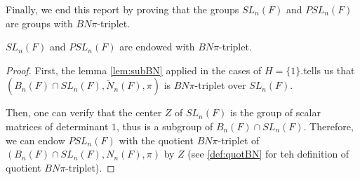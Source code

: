 Finally, we end this report by proving that the groups $SL_n(F)$ and $PSL_n(F)$ are groups with $BN\pi$-triplet.

\begin{proposition}
    $SL_n\left( F \right)$ and $PSL_n\left( F \right)$ are endowed with $BN\pi$-triplet. 
\end{proposition}
\begin{proof}
    First, the lemma \ref{lem:subBN} applied in the cases of $H = \{1\}$.tells us that $\left( B_n\left( F \right) \cap SL_n(F), \tilde{N}_n(F), \pi \right)$ is $BN\pi$-triplet over $SL_n(F)$.

    Then, one can verify that the center $Z$ of $SL_n\left( F \right)$ is the group of scalar matrices of determinant $1$, thus is a subgroup of $B_n(F) \cap SL_n\left( F \right)$. Therefore, we can endow $PSL_n(F)$ with the quotient $BN\pi$-triplet of $\left( B_n(F) \cap SL_n(F), N_n(F), \pi \right)$ by $Z$ (see \ref{def:quotBN} for teh definition of quotient $BN\pi$-triplet).
\end{proof}
